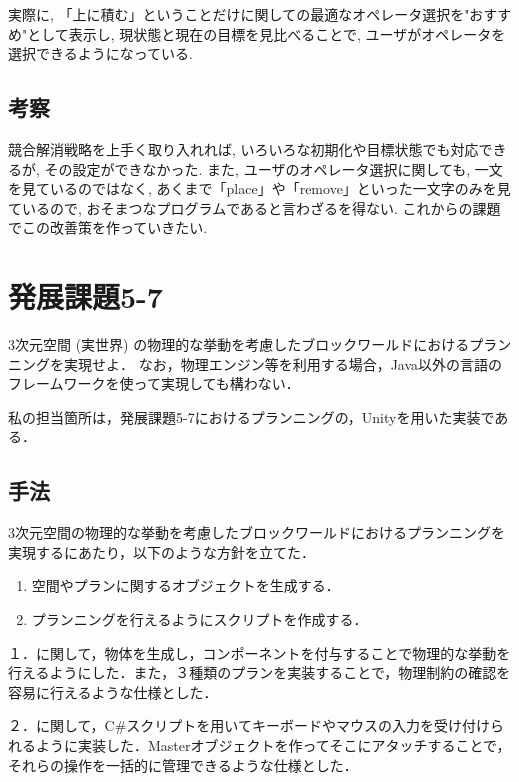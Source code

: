 \documentclass[uplatex,12pt]{jsarticle}
\begin{document}
実際に, 「上に積む」ということだけに関しての最適なオペレータ選択を"おすすめ"として表示し, 現状態と現在の目標を見比べることで, ユーザがオペレータを選択できるようになっている.

\subsection{考察}
競合解消戦略を上手く取り入れれば, いろいろな初期化や目標状態でも対応できるが, その設定ができなかった. また, ユーザのオペレータ選択に関しても, 一文を見ているのではなく, あくまで「place」や「remove」といった一文字のみを見ているので, おそまつなプログラムであると言わざるを得ない. これからの課題でこの改善策を作っていきたい.


\section{発展課題5-7}
\begin{screen}
    3次元空間 (実世界) の物理的な挙動を考慮したブロックワールドにおけるプランニングを実現せよ．
    なお，物理エンジン等を利用する場合，Java以外の言語のフレームワークを使って実現しても構わない．
\end{screen}
私の担当箇所は，発展課題5-7におけるプランニングの，Unityを用いた実装である．


\subsection{手法}
3次元空間の物理的な挙動を考慮したブロックワールドにおけるプランニングを実現するにあたり，以下のような方針を立てた．
\begin{enumerate}
\item 空間やプランに関するオブジェクトを生成する．
\item プランニングを行えるようにスクリプトを作成する．
\end{enumerate}

１．に関して，物体を生成し，コンポーネントを付与することで物理的な挙動を行えるようにした．また，３種類のプランを実装することで，物理制約の確認を容易に行えるような仕様とした．

２．に関して，C\#スクリプトを用いてキーボードやマウスの入力を受け付けられるように実装した．Masterオブジェクトを作ってそこにアタッチすることで，それらの操作を一括的に管理できるような仕様とした．
\end{document}
